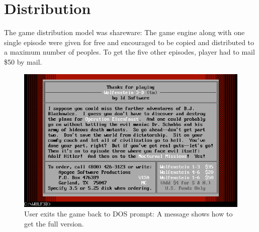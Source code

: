 \documentclass[book.tex]{subfiles}
\begin{document}
\section{Distribution}
The game distribution model was shareware: The game engine along with one single episode were given for free and encouraged to be copied and distributed to a maximum number of peoples. To get the five other episodes, player had to mail \$50 by mail.\\
\par
\begin{figure}[H]
\centering
 \includegraphics[width=\textwidth]{screenshots/shareware.png}
 \caption{User exits the game back to DOS prompt: A message shows how to get the full version.}
 \end{figure}
\end{document}
